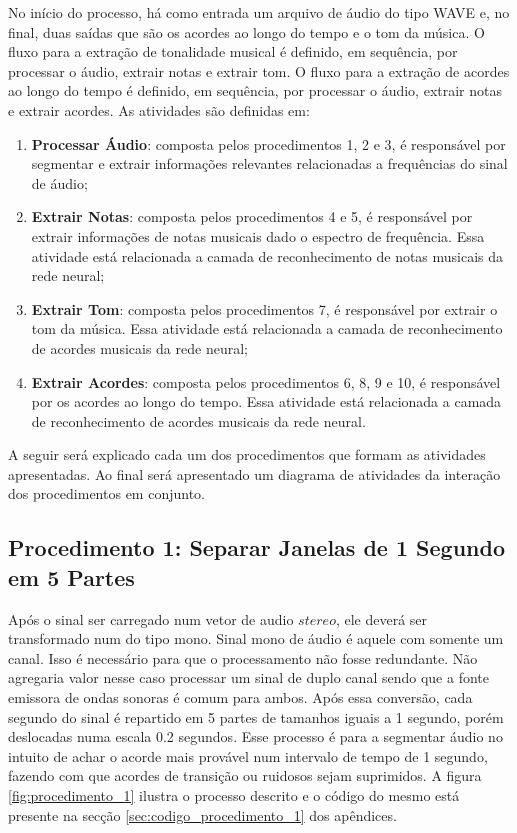 \newpage
No início do processo, há como entrada um arquivo de áudio do tipo WAVE e, no final, duas saídas que são os acordes ao longo do tempo e o tom da música. O fluxo para a extração de tonalidade musical é definido, em sequência, por processar o áudio, extrair notas e extrair tom. O fluxo para a extração de acordes ao longo do tempo é definido, em sequência, por processar o áudio, extrair notas e extrair acordes. As atividades são definidas em:
\begin{enumerate}
	\item \textbf{Processar Áudio}: composta pelos procedimentos 1, 2 e 3, é responsável por segmentar e extrair informações relevantes relacionadas a frequências do sinal de áudio;
	\item \textbf{Extrair Notas}: composta pelos procedimentos 4 e 5, é responsável por extrair informações de notas musicais dado o espectro de frequência. Essa atividade está relacionada a camada de reconhecimento de notas musicais da rede neural;
	\item \textbf{Extrair Tom}: composta pelos procedimentos 7, é responsável por extrair o tom da música. Essa atividade está relacionada a camada de reconhecimento de acordes musicais da rede neural;
	\item \textbf{Extrair Acordes}: composta pelos procedimentos 6, 8, 9 e 10, é responsável por os acordes ao longo do tempo. Essa atividade está relacionada a camada de reconhecimento de acordes musicais da rede neural.
\end{enumerate}

A seguir será explicado cada um dos procedimentos que formam as atividades apresentadas. Ao final será apresentado um diagrama de atividades da interação dos procedimentos em conjunto. 

\subsection{Procedimento 1: Separar Janelas de 1 Segundo em 5 Partes}
\label{subsec:procedimento_1}

Após o sinal ser carregado num vetor de audio $stereo$, ele deverá ser transformado num do tipo mono. Sinal mono de áudio é aquele com somente um canal. Isso é necessário para que o processamento não fosse redundante. Não agregaria valor nesse caso processar um sinal de duplo canal sendo que a fonte emissora de ondas sonoras é comum para ambos. Após essa conversão, cada segundo do sinal é repartido em 5 partes de tamanhos iguais a 1 segundo, porém deslocadas numa escala 0.2 segundos. Esse processo é para a segmentar áudio no intuito de achar o acorde mais provável num intervalo de tempo de 1 segundo, fazendo com que acordes de transição ou ruidosos sejam suprimidos. A figura \ref{fig:procedimento_1} ilustra o processo descrito e o código do mesmo está presente na secção \ref{sec:codigo_procedimento_1} dos apêndices.

